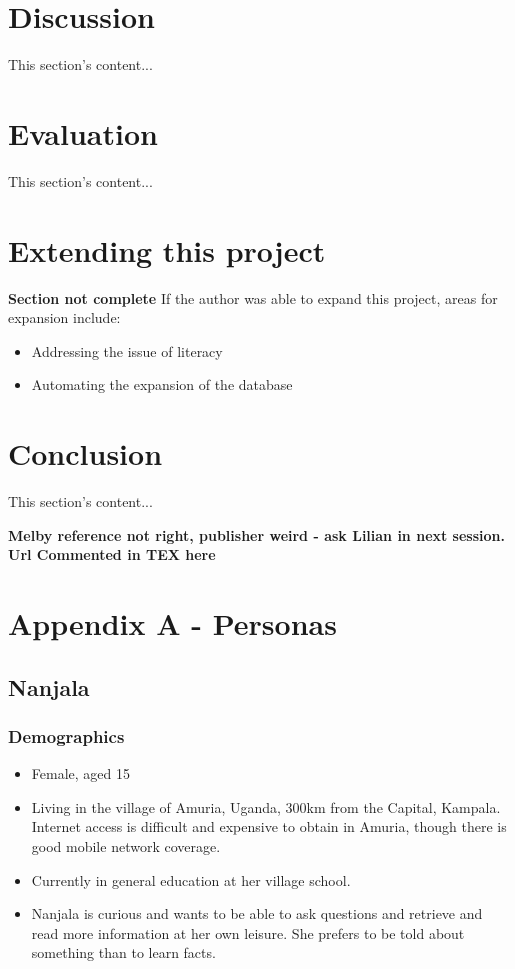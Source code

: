\documentclass{article}
\begin{document}
\newpage
\section{Discussion}
\label{sec:discussion}
This section's content...

\newpage

\newpage
\section{Evaluation}
\label{sec:evaluation}
This section's content...

\newpage

\section{Extending this project}
\label{sec:extending}
{\bf Section not complete} %
If the author was able to expand this project, areas for expansion include:
\begin{itemize}
  \item Addressing the issue of literacy
  \item Automating the expansion of the database
\end{itemize}

\newpage

\section{Conclusion}
\label{sec:conclusion}
This section's content...

\newpage

{\bf Melby reference not right, publisher weird - ask Lilian in next session.  Url Commented in TEX here} 



\newpage
\section{Appendix A - Personas}
\label{sec:appendixPersonas}
\subsection{Nanjala}
\subsubsection{Demographics}
\begin{itemize}
  \item Female, aged 15
  \item Living in the village of Amuria, Uganda, 300km from the Capital, Kampala.  Internet access is difficult and expensive to obtain in Amuria, though there is good mobile network coverage.
  \item Currently in general education at her village school.
  \item Nanjala is curious and wants to be able to ask questions and retrieve and read more information at her own leisure.  She prefers to be told about something than to learn facts.
\end{itemize}
\end{document}

